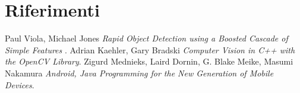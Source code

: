 
\chapter{Riferimenti} %

\label{Riferimenti} %


\begin{thebibliography}{1}
 Paul Viola, Michael Jones {\em Rapid Object Detection using a Boosted Cascade of Simple
Features
}.
 Adrian Kaehler, Gary Bradski {\em Computer Vision in C++ with the OpenCV Library}.
 Zigurd Mednieks, Laird Dornin, G. Blake Meike, Masumi Nakamura {\em Android, Java Programming for the New Generation of Mobile Devices}.


\end{thebibliography}



